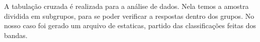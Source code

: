 \hspace{1.5cm}
A tabulação cruzada é realizada para a análise de dados. Nela temos a amostra dividida em subgrupos, para se poder verificar a respostas dentro dos grupos. No nosso caso foi gerado um arquivo de estaticas, partido das classificações feitas dos bandas.